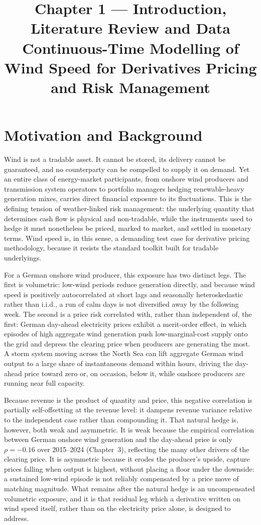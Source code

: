 ﻿\documentclass[11pt, a4paper, twoside]{article}
\title{\textbf{Chapter 1 --- Introduction, Literature Review and Data}\\[4pt]
\large Continuous-Time Modelling of Wind Speed for Derivatives Pricing and Risk Management}
\author{}
\date{}
\begin{document}
\maketitle

\section{Motivation and Background}
\label{sec:motivation}

Wind is not a tradable asset. It cannot be stored, its delivery cannot be guaranteed, and no counterparty can be compelled to supply it on demand. Yet an entire class of energy-market participants, from onshore wind producers and transmission system operators to portfolio managers hedging renewable-heavy generation mixes, carries direct financial exposure to its fluctuations. This is the defining tension of weather-linked risk management: the underlying quantity that determines cash flow is physical and non-tradable, while the instruments used to hedge it must nonetheless be priced, marked to market, and settled in monetary terms. Wind speed is, in this sense, a demanding test case for derivative pricing methodology, because it resists the standard toolkit built for tradable underlyings.

For a German onshore wind producer, this exposure has two distinct legs. The first is volumetric: low-wind periods reduce generation directly, and because wind speed is positively autocorrelated at short lags and seasonally heteroskedastic rather than i.i.d., a run of calm days is not diversified away by the following week. The second is a price risk correlated with, rather than independent of, the first: German day-ahead electricity prices exhibit a merit-order effect, in which episodes of high aggregate wind generation push low-marginal-cost supply onto the grid and depress the clearing price when producers are generating the most. A storm system moving across the North Sea can lift aggregate German wind output to a large share of instantaneous demand within hours, driving the day-ahead price toward zero or, on occasion, below it, while onshore producers are running near full capacity.

Because revenue is the product of quantity and price, this negative correlation is partially self-offsetting at the revenue level: it dampens revenue variance relative to the independent case rather than compounding it. That natural hedge is, however, both weak and asymmetric. It is weak because the empirical correlation between German onshore wind generation and the day-ahead price is only $\rho = -0.16$ over 2015--2024 (Chapter~3), reflecting the many other drivers of the clearing price. It is asymmetric because it erodes the producer's upside, capture prices falling when output is highest, without placing a floor under the downside: a sustained low-wind episode is not reliably compensated by a price move of matching magnitude. What remains after the natural hedge is an uncompensated volumetric exposure, and it is that residual leg which a derivative written on wind speed itself, rather than on the electricity price alone, is designed to address.
\end{document}
